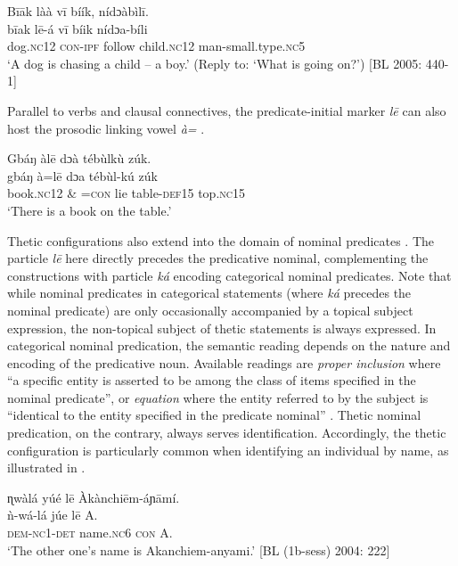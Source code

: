 \documentclass[output=paper]{langsci/langscibook}
\begin{document}
\ea\label{ex:schwarz:15}
\glll  B\={i}\={a}k    làà    v\={i}  bíík,    nídɔàbìl\={i}.\\
    \textup{b\={i}ak}    l\={e}-á    v\={i}  bíik    {nídɔa-bíli}\\
       dog.\textsc{nc}12  \textsc{con}-\textsc{ipf}  follow  child.\textsc{nc}12  man-small.type.\textsc{nc}5\\
\glt ‘A dog is chasing a child – a boy.’ (Reply to: ‘What is going on?’) [BL  2005: 440-1]
\z

Parallel to verbs and clausal connectives, the predicate-initial marker \textit{l\={e}} can also host the prosodic linking vowel \textit{à}\textit{=} .

\ea\label{ex:schwarz:16}
\glll   Gbáŋ    àl\={e}    dɔà  tébùlkù    zúk.\\
    \textup{gbáŋ}    à=l\={e}    dɔa  tébùl-kú  {zúk}\\
       book.\textsc{nc}12   \& =\textsc{con}  lie  table-\textsc{def}15  top.\textsc{nc}15\\
\glt ‘There is a book on the table.’ \citep[271]{Schwarz2009}
\z

Thetic configurations also extend into the domain of nominal predicates . The particle \textit{l\={e}} here directly precedes the predicative nominal, complementing the constructions with particle \textit{ká} encoding categorical nominal predicates. Note that while nominal predicates in categorical statements (where \textit{ká} precedes the nominal predicate) are only occasionally accompanied by a topical subject expression, the non-topical subject of thetic statements is always expressed. In categorical nominal predication, the semantic reading depends on the nature and encoding of the predicative noun. Available readings are \textit{proper inclusion} where “a specific entity is asserted to be among the class of items specified in the nominal predicate”, or \textit{equation} where the entity referred to by the subject is “identical to the entity specified in the predicate nominal” \citep[114]{Payne1997}. Thetic nominal predication, on the contrary, always serves identification. Accordingly, the thetic configuration is particularly common when identifying an individual by name, as illustrated in .

\ea\label{ex:schwarz:17}
\glll   ɳwàlá     yúé    l\={e}   Àkànchi\={e}m-áɲ\={a}mí.\\
    \textup{ǹ}\textup{-wá-lá}   júe    l\={e}   {A.}\\
     \textsc{dem}-\textsc{nc}1-\textsc{det } name\textsc{.nc}6  \textsc{con}  A.\\
\glt ‘The other one’s name is Akanchiem-anyami.’ [BL (1b-sess) 2004: 222]
\z
\end{document}
